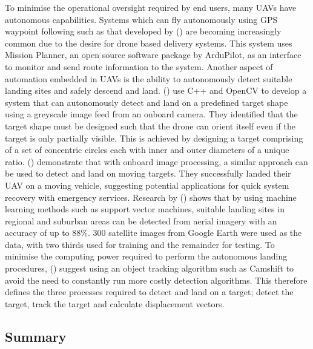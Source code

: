 To minimise the operational oversight required by end users, many UAVs have autonomous capabilities. Systems which can fly autonomously using GPS waypoint following such as that developed by \citeauthor{Tom1} (\citeyear{Tom1}) are becoming increasingly common due to the desire for drone based delivery systems. This system uses Mission Planner, an open source software package by ArduPilot, as an interface to monitor and send route information to the system. Another aspect of automation embedded in UAVs is the ability to autonomously detect suitable landing sites and safely descend and land. \citeauthor{Tom2} (\citeyear{Tom2}) use C++ and OpenCV to develop a system that can autonomously detect and land on a predefined target shape using a greyscale image feed from an onboard camera. They identified that the target shape must be designed such that the drone can orient itself even if the target is only partially visible. This is achieved by designing a target comprising of a set of concentric circles each with inner and outer diameters of a unique ratio. \citeauthor{Tom3} (\citeyear{Tom3}) demonstrate that with onboard image processing, a similar approach can be used to detect and land on moving targets. They successfully landed their UAV on a moving vehicle, suggesting potential applications for quick system recovery with emergency services. Research by \citeauthor{Tom4} (\citeyear{Tom4}) shows that by using machine learning methods such as support vector machines, suitable landing sites in regional and suburban areas can be detected from aerial imagery with an accuracy of up to 88\%. 300 satellite images from Google Earth were used as the data, with two thirds used for training and the remainder for testing. To minimise the computing power required to perform the autonomous landing procedures, \citeauthor{Tom5} (\citeyear{Tom5}) suggest using an object tracking algorithm such as Camshift to avoid the need to constantly run more costly detection algorithms. This therefore defines the three processes required to detect and land on a target; detect the target, track the target and calculate displacement vectors. 






\subsection{Summary}


\clearpage


